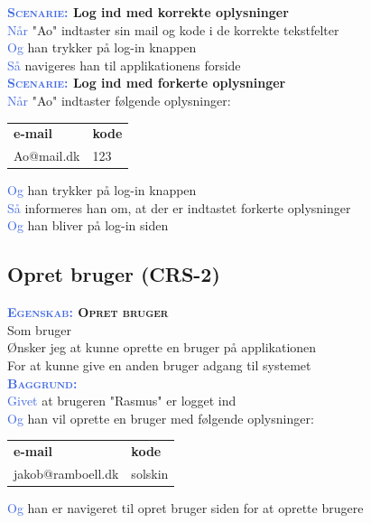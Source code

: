 \textbf{\textsc{\textcolor{RoyalBlue}{Scenarie:}} Log ind med korrekte oplysninger}\\
\textcolor{RoyalBlue}{Når} "Ao" indtaster sin mail og kode i de korrekte tekstfelter\\
\textcolor{RoyalBlue}{Og} han trykker på log-in knappen\\
\textcolor{RoyalBlue}{Så} navigeres han til applikationens forside\\

\textbf{\textsc{\textcolor{RoyalBlue}{Scenarie:}} Log ind med forkerte oplysninger} \\
\textcolor{RoyalBlue}{Når} "Ao" indtaster følgende oplysninger:\\
\begin{tabular}{| l | l |}
	\textbf{e-mail} & \textbf{kode}\\
	Ao@mail.dk & 123\\
\end{tabular}
\newline \newline

\textcolor{RoyalBlue}{Og} han trykker på log-in knappen\\
\textcolor{RoyalBlue}{Så} informeres han om, at der er indtastet forkerte oplysninger\\
\textcolor{RoyalBlue}{Og} han bliver på log-in siden\\

\subsection{Opret bruger (CRS-2)} \label{sec:USOpretBruger}
\textbf{\textsc{\textcolor{RoyalBlue}{Egenskab:} Opret bruger}} \\
Som bruger\\
Ønsker jeg at kunne oprette en bruger på applikationen\\
For at kunne give en anden bruger adgang til systemet \\

\textcolor{RoyalBlue}{\textbf{\textsc{Baggrund:}}}\\
\textcolor{RoyalBlue}{Givet} at brugeren "Rasmus" er logget ind \\
\textcolor{RoyalBlue}{Og} han vil oprette en bruger med følgende oplysninger:\\
\begin{tabular}{| l | l |}
	\textbf{e-mail} & \textbf{kode} \\
	jakob@ramboell.dk & solskin\\
\end{tabular}
\newline \newline
\textcolor{RoyalBlue}{Og} han er navigeret til opret bruger siden for at oprette brugere  \\

